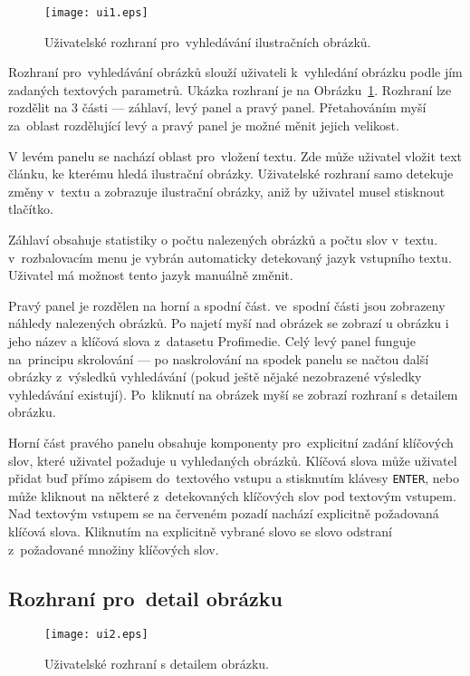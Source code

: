 \begin{figure}[h]
  \centering
  \texttt{[image: ui1.eps]}
  \caption{Uživatelské rozhraní pro~vyhledávání ilustračních obrázků.}
  \label{fig:ui1}
\end{figure}

Rozhraní pro~vyhledávání obrázků slouží uživateli k~vyhledání obrázku podle jím zadaných textových parametrů. Ukázka rozhraní je na Obrázku~\ref{fig:ui1}. Rozhraní lze rozdělit na 3 části --- záhlaví, levý panel a pravý panel. Přetahováním myší za~oblast rozdělující levý a pravý panel je možné měnit jejich velikost.

V levém panelu se nachází oblast pro~vložení textu. Zde může uživatel vložit text článku, ke kterému hledá ilustrační obrázky. Uživatelské rozhraní samo detekuje změny v~textu a zobrazuje ilustrační obrázky, aniž by uživatel musel stisknout tlačítko.

Záhlaví obsahuje statistiky o počtu nalezených obrázků a počtu slov v~textu. v~rozbalovacím menu je vybrán automaticky detekovaný jazyk vstupního textu. Uživatel má možnost tento jazyk manuálně změnit.

Pravý panel je rozdělen na horní a spodní část. ve~spodní části jsou zobrazeny náhledy nalezených obrázků. Po najetí myší nad obrázek se zobrazí u obrázku i jeho název a klíčová slova z~datasetu Profimedie. Celý levý panel funguje na~principu  skrolování --- po naskrolování na spodek panelu se načtou další obrázky z~výsledků vyhledávání (pokud ještě nějaké nezobrazené výsledky vyhledávání existují). Po~kliknutí na obrázek myší se zobrazí rozhraní s detailem obrázku.

Horní část pravého panelu obsahuje komponenty pro~explicitní zadání klíčových slov, které uživatel požaduje u vyhledaných obrázků. Klíčová slova může uživatel přidat buď přímo zápisem do~textového vstupu  a stisknutím klávesy \lstinline{ENTER}, nebo může kliknout na některé z~detekovaných klíčových slov pod textovým vstupem. Nad textovým vstupem se na červeném pozadí nachází explicitně požadovaná klíčová slova. Kliknutím na explicitně vybrané slovo se slovo odstraní z~požadované množiny klíčových slov.

\subsection{Rozhraní pro~detail obrázku}

\begin{figure}[h]
  \centering
  \texttt{[image: ui2.eps]}
  \caption{Uživatelské rozhraní s detailem obrázku.}
  \label{fig:ui2}
\end{figure}

